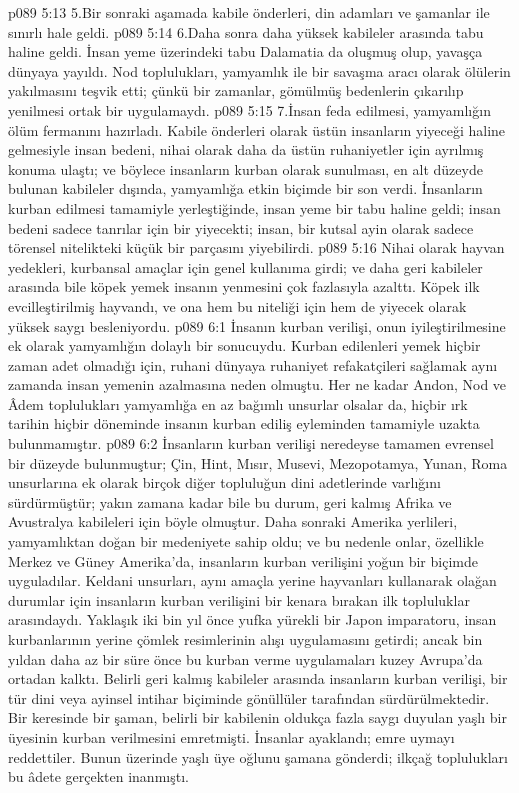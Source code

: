 \vs p089 5:13 5.\bibnobreakspace Bir sonraki aşamada kabile önderleri, din adamları ve şamanlar ile sınırlı hale geldi.
\vs p089 5:14 6.\bibnobreakspace Daha sonra daha yüksek kabileler arasında tabu haline geldi. İnsan yeme üzerindeki tabu Dalamatia da oluşmuş olup, yavaşça dünyaya yayıldı. Nod toplulukları, yamyamlık ile bir savaşma aracı olarak ölülerin yakılmasını teşvik etti; çünkü bir zamanlar, gömülmüş bedenlerin çıkarılıp yenilmesi ortak bir uygulamaydı.
\vs p089 5:15 7.\bibnobreakspace İnsan feda edilmesi, yamyamlığın ölüm fermanını hazırladı. Kabile önderleri olarak üstün insanların yiyeceği haline gelmesiyle insan bedeni, nihai olarak daha da üstün ruhaniyetler için ayrılmış konuma ulaştı; ve böylece insanların kurban olarak sunulması, en alt düzeyde bulunan kabileler dışında, yamyamlığa etkin biçimde bir son verdi. İnsanların kurban edilmesi tamamiyle yerleştiğinde, insan yeme bir tabu haline geldi; insan bedeni sadece tanrılar için bir yiyecekti; insan, bir kutsal ayin olarak sadece törensel nitelikteki küçük bir parçasını yiyebilirdi.
\vs p089 5:16 Nihai olarak hayvan yedekleri, kurbansal amaçlar için genel kullanıma girdi; ve daha geri kabileler arasında bile köpek yemek insanın yenmesini çok fazlasıyla azalttı. Köpek ilk evcilleştirilmiş hayvandı, ve ona hem bu niteliği için hem de yiyecek olarak yüksek saygı besleniyordu.
\vs p089 6:1 İnsanın kurban verilişi, onun iyileştirilmesine ek olarak yamyamlığın dolaylı bir sonucuydu. Kurban edilenleri yemek hiçbir zaman adet olmadığı için, ruhani dünyaya ruhaniyet refakatçileri sağlamak aynı zamanda insan yemenin azalmasına neden olmuştu. Her ne kadar Andon, Nod ve Âdem toplulukları yamyamlığa en az bağımlı unsurlar olsalar da, hiçbir ırk tarihin hiçbir döneminde insanın kurban ediliş eyleminden tamamiyle uzakta bulunmamıştır.
\vs p089 6:2 İnsanların kurban verilişi neredeyse tamamen evrensel bir düzeyde bulunmuştur; Çin, Hint, Mısır, Musevi, Mezopotamya, Yunan, Roma unsurlarına ek olarak birçok diğer topluluğun dini adetlerinde varlığını sürdürmüştür; yakın zamana kadar bile bu durum, geri kalmış Afrika ve Avustralya kabileleri için böyle olmuştur. Daha sonraki Amerika yerlileri, yamyamlıktan doğan bir medeniyete sahip oldu; ve bu nedenle onlar, özellikle Merkez ve Güney Amerika’da, insanların kurban verilişini yoğun bir biçimde uyguladılar. Keldani unsurları, aynı amaçla yerine hayvanları kullanarak olağan durumlar için insanların kurban verilişini bir kenara bırakan ilk topluluklar arasındaydı. Yaklaşık iki bin yıl önce yufka yürekli bir Japon imparatoru, insan kurbanlarının yerine çömlek resimlerinin alışı uygulamasını getirdi; ancak bin yıldan daha az bir süre önce bu kurban verme uygulamaları kuzey Avrupa’da ortadan kalktı. Belirli geri kalmış kabileler arasında insanların kurban verilişi, bir tür dini veya ayinsel intihar biçiminde gönüllüler tarafından sürdürülmektedir. Bir keresinde bir şaman, belirli bir kabilenin oldukça fazla saygı duyulan yaşlı bir üyesinin kurban verilmesini emretmişti. İnsanlar ayaklandı; emre uymayı reddettiler. Bunun üzerinde yaşlı üye oğlunu şamana gönderdi; ilkçağ toplulukları bu âdete gerçekten inanmıştı.
